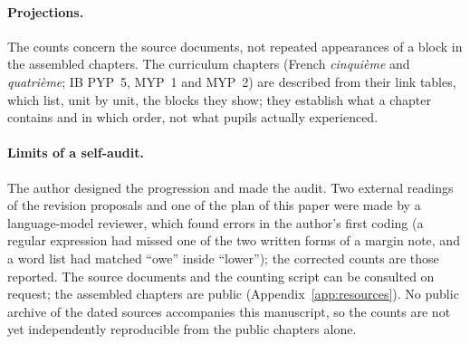 \documentclass[11pt,a4paper]{article}
\theoremstyle{definition}
\begin{document}
\paragraph{Projections.} The counts concern the source documents, not repeated appearances of a block in the assembled chapters. The curriculum chapters (French \emph{cinqui\`eme} and \emph{quatri\`eme}; IB PYP~5, MYP~1 and MYP~2) are described from their link tables, which list, unit by unit, the blocks they show; they establish what a chapter contains and in which order, not what pupils actually experienced.

\paragraph{Limits of a self-audit.} The author designed the progression and made the audit. Two external readings of the revision proposals and one of the plan of this paper were made by a language-model reviewer, which found errors in the author's first coding (a regular expression had missed one of the two written forms of a margin note, and a word list had matched ``owe'' inside ``lower''); the corrected counts are those reported. The source documents and the counting script can be consulted on request; the assembled chapters are public (Appendix~\ref{app:resources}). No public archive of the dated sources accompanies this manuscript, so the counts are not yet independently reproducible from the public chapters alone.
\end{document}
